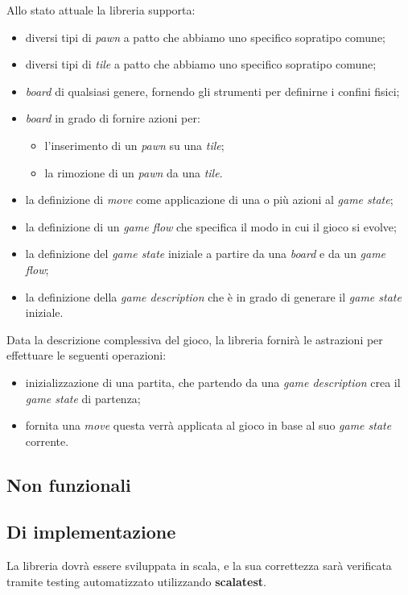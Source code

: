 Allo stato attuale la libreria supporta:
%
\begin{itemize}
    \item diversi tipi di \textit{pawn} a patto che abbiamo uno specifico sopratipo comune;
    \item diversi tipi di \textit{tile} a patto che abbiamo uno specifico sopratipo comune;
    \item \textit{board} di qualsiasi genere, fornendo gli strumenti per definirne i confini fisici;
    \item \textit{board} in grado di fornire azioni per:
    \begin{itemize}
        \item l'inserimento di un \textit{pawn} su una \textit{tile};
        \item la rimozione di un \textit{pawn} da una \textit{tile}.
    \end{itemize}
    \item la definizione di \textit{move} come applicazione di una o più azioni al \textit{game state};
    \item la definizione di un \textit{game flow} che specifica il modo in cui il gioco si evolve;
    \item la definizione del \textit{game state} iniziale a partire da una \textit{board} e da un \textit{game flow};
    \item la definizione della \textit{game description} che è in grado di generare il \textit{game state} iniziale.
\end{itemize}
%
Data la descrizione complessiva del gioco, la libreria fornirà le astrazioni per effettuare le seguenti operazioni:
%
\begin{itemize}
    \item inizializzazione di una partita, che partendo da una \textit{game description} crea il \textit{game state} di partenza;
    \item fornita una \textit{move} questa verrà applicata al gioco in base al suo \textit{game state} corrente.
\end{itemize}

\subsection{Non funzionali}



\subsection{Di implementazione}

La libreria dovrà essere sviluppata in scala, e la sua correttezza sarà verificata tramite testing automatizzato utilizzando \textbf{scalatest}.